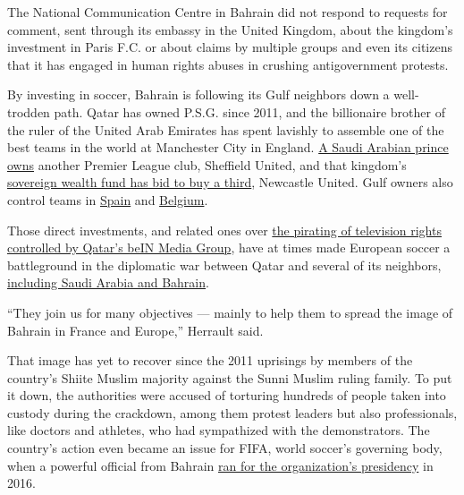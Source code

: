 The National Communication Centre in Bahrain did not respond to requests
for comment, sent through its embassy in the United Kingdom, about the
kingdom's investment in Paris F.C. or about claims by multiple groups
and even its citizens that it has engaged in human rights abuses in
crushing antigovernment protests.

By investing in soccer, Bahrain is following its Gulf neighbors down a
well-trodden path. Qatar has owned P.S.G. since 2011, and the
billionaire brother of the ruler of the United Arab Emirates has spent
lavishly to assemble one of the best teams in the world at Manchester
City in England.
\href{https://www.sufc.co.uk/news/2019/october/key-personnel/}{A Saudi
Arabian prince owns} another Premier League club, Sheffield United, and
that kingdom's
\href{https://www.nytimes3xbfgragh.onion/2020/04/30/sports/premier-league-saudi-arabia.html}{sovereign
wealth fund has bid to buy a third}, Newcastle United. Gulf owners also
control teams in
\href{https://www.wsj.com/articles/the-saudi-power-broker-of-spanish-soccers-second-division-11595851200}{Spain}
and
\href{https://www.nytimes3xbfgragh.onion/2014/07/16/sports/worldcup/a-qatari-soccer-program-looking-to-rise-buys-a-foothold-in-europe.html}{Belgium}.

Those direct investments, and related ones over
\href{https://www.nytimes3xbfgragh.onion/2018/05/09/sports/bein-sports-qatar-beoutq.html}{the
pirating of television rights controlled by Qatar's beIN Media Group},
have at times made European soccer a battleground in the diplomatic war
between Qatar and several of its neighbors,
\href{https://www.nytimes3xbfgragh.onion/2020/04/21/sports/soccer/saudi-arabia-qatar-beIN-premier-league.html}{including
Saudi Arabia and Bahrain}.

``They join us for many objectives --- mainly to help them to spread the
image of Bahrain in France and Europe,'' Herrault said.

That image has yet to recover since the 2011 uprisings by members of the
country's Shiite Muslim majority against the Sunni Muslim ruling family.
To put it down, the authorities were accused of torturing hundreds of
people taken into custody during the crackdown, among them protest
leaders but also professionals, like doctors and athletes, who had
sympathized with the demonstrators. The country's action even became an
issue for FIFA, world soccer's governing body, when a powerful official
from Bahrain
\href{https://www.nytimes3xbfgragh.onion/2016/02/25/sports/soccer/sheikhs-candidacy-opens-new-door-to-criticism-of-fifa-human-rights.html}{ran
for the organization's presidency} in 2016.

